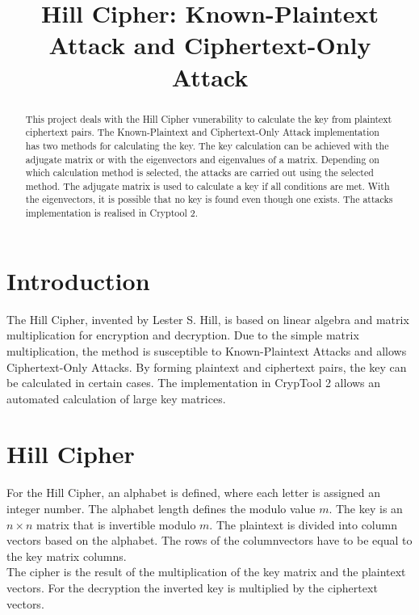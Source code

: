 \documentclass[conference]{IEEEtran}
\begin{document}
\title{Hill Cipher: Known-Plaintext Attack and Ciphertext-Only Attack\\}

\author{
}

\maketitle

\begin{abstract}
This project deals with the Hill Cipher vunerability to calculate the key from plaintext ciphertext pairs. The Known-Plaintext and Ciphertext-Only Attack implementation has two methods for calculating the key. The key calculation can be achieved with the adjugate matrix or with the eigenvectors and eigenvalues of a matrix. Depending on which calculation method is selected, the attacks are carried out using the selected method. The adjugate matrix is used to calculate a key if all conditions are met. With the eigenvectors, it is possible that no key is found even though one exists. The attacks implementation is realised in Cryptool 2.
\end{abstract}

\section{Introduction}
The Hill Cipher, invented by Lester S. Hill, is based on linear algebra and matrix multiplication for encryption and decryption. 
Due to the simple matrix multiplication, the method is susceptible to Known-Plaintext Attacks and allows Ciphertext-Only 
Attacks. By forming plaintext and ciphertext pairs, the key can be calculated in certain cases. The implementation in CrypTool 2 
allows an automated calculation of large key matrices.

\section{Hill Cipher}

For the Hill Cipher, an alphabet is defined, where each letter is assigned an integer number. The alphabet length defines the modulo value \( m \). The key is an \( n \times n \) matrix that is invertible modulo \( m \). The plaintext is divided into column vectors based on the alphabet. The rows of the columnvectors have to be equal to the key matrix columns.\\
The cipher is the result of the multiplication of the key matrix and the plaintext vectors. For the decryption the inverted key is multiplied by the ciphertext vectors\cite{b1}.
\end{document}
